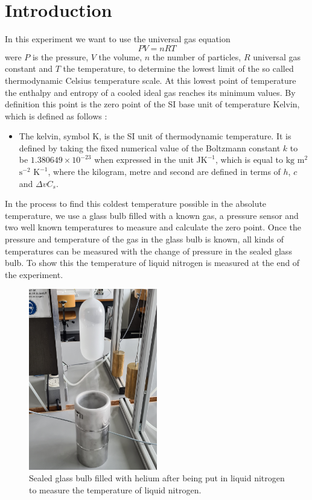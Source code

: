 \section{Introduction}

In this experiment we want to use the universal gas equation \cite{gas}
\begin{equation}
	\displaystyle PV=nRT
	\label{eq::gas}
\end{equation} were $P$ is the pressure, $V$ the volume, $n$ the number of particles, $R$ universal gas constant and $T$ the temperature, to determine the lowest limit of the so called thermodynamic Celsius temperature scale.
At this lowest point of temperature the enthalpy and entropy of a cooled ideal gas reaches its minimum values.
By definition this point is the zero point of the SI base unit of temperature Kelvin, which is defined as follows \cite{kelvin}:
\begin{itemize}
	\item The kelvin, symbol K, is the SI unit of thermodynamic temperature. It is defined
	by taking the fixed numerical value of the Boltzmann constant $k$ to be
	$1.380 649 \times 10^{-23}$ when expressed in the unit \si{\J}$\si{\K}^{-1}$, which is equal to $\si{\kg}$ $\si{\m}^2$ $\si{\s}^{-2}$ $\si{\K}^{-1}$,
	where the kilogram, metre and second are defined in terms of $h$, $c$ and $\Delta vC_s$.
\end{itemize}
 
In the process to find this coldest temperature possible in the absolute temperature, we use a glass bulb filled with a known gas, a pressure sensor and two well known temperatures to measure and calculate the zero point. 
Once the pressure and temperature of the gas in the glass bulb is known, all kinds of temperatures can be measured with the change of pressure in the sealed glass bulb.
To show this the temperature of liquid nitrogen is measured at the end of the experiment.
\begin{figure}[h]
	\centering
	\includegraphics[width=0.5\textwidth]{sections/images/liquid.jpg}
	\caption{Sealed glass bulb filled with helium after being put in liquid nitrogen to measure the temperature of liquid nitrogen.}
\end{figure}
